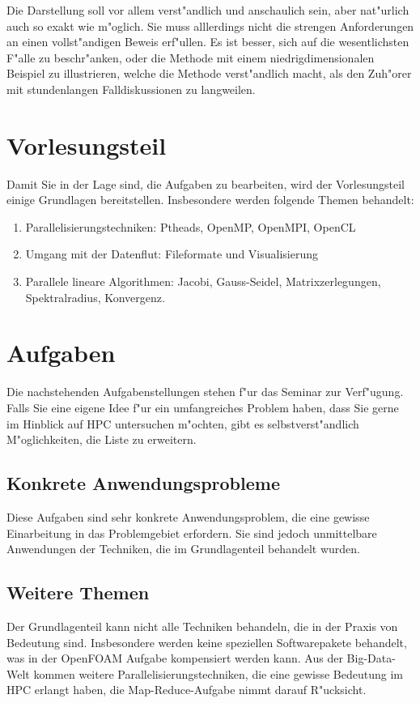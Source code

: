 \documentclass[a4paper,12pt]{article}
\begin{document}
Die Darstellung soll vor allem verst"andlich und anschaulich
sein, aber nat"urlich auch so exakt wie m"oglich.
Sie muss alllerdings nicht die strengen Anforderungen an einen
vollst"andigen Beweis erf"ullen. Es ist besser, sich auf die
wesentlichsten F"alle zu beschr"anken, oder die Methode mit
einem niedrigdimensionalen Beispiel zu illustrieren, welche
die Methode verst"andlich macht, als den Zuh"orer mit stundenlangen
Falldiskussionen zu langweilen.

\section{Vorlesungsteil}
Damit Sie in der Lage sind, die Aufgaben zu bearbeiten, wird der
Vorlesungsteil einige Grundlagen bereitstellen. Insbesondere werden
folgende Themen behandelt:
\begin{enumerate}
\item Parallelisierungstechniken: Ptheads, OpenMP, OpenMPI, OpenCL
\item Umgang mit der Datenflut: Fileformate und Visualisierung
\item Parallele lineare Algorithmen: Jacobi, Gauss-Seidel, Matrixzerlegungen,
Spektralradius, Konvergenz.
\end{enumerate}

\section{Aufgaben}
Die nachstehenden Aufgabenstellungen stehen f"ur das Seminar zur
Verf"ugung.
Falls Sie eine eigene Idee f"ur ein umfangreiches Problem haben, dass
Sie gerne im Hinblick auf HPC untersuchen m"ochten, gibt es selbstverst"andlich
M"oglichkeiten, die Liste zu erweitern.

\newtheorem{aufgabe}{Aufgabe}

\subsection{Konkrete Anwendungsprobleme}
Diese Aufgaben sind sehr konkrete Anwendungsproblem, die eine
gewisse Einarbeitung in das Problemgebiet erfordern. Sie sind jedoch
unmittelbare Anwendungen der Techniken, die im Grundlagenteil behandelt
wurden.






\subsection{Weitere Themen}
Der Grundlagenteil kann nicht alle Techniken behandeln, die in der
Praxis von Bedeutung sind.
Insbesondere werden keine speziellen Softwarepakete behandelt,
was in der OpenFOAM Aufgabe kompensiert werden kann. 
Aus der Big-Data-Welt kommen weitere Parallelisierungstechniken,
die eine gewisse Bedeutung im HPC erlangt haben, die Map-Reduce-Aufgabe
nimmt darauf R"ucksicht.



\end{document}
